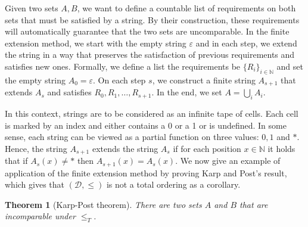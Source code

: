 \documentclass[12pt,a4paper]{article}
\newtheorem{theorem}{Theorem}
\theoremstyle{definition}
\newcommand{\N}{\mathbb{N}}                     %
\begin{document}
    Given two sets $A,B$, we want to define a countable list of requirements on both sets that must be satisfied by a string. By their construction, these requirements will automatically guarantee that the two sets are uncomparable. In the finite extension method, we start with the empty string $\varepsilon$ and in each step, we extend the string in a way that preserves the satisfaction of previous requirements and satisfies new ones. Formally, we define a list the requirements be $\{R_i\}_{i \in \N}$ and set the empty string $A_0 = \varepsilon$. On each step $s$, we construct a finite string $A_{s+1}$ that extends $A_s$ and satisfies $R_0, R_1, \ldots, R_{s+1}$. In the end, we set $A = \bigcup_{i} A_i$.
    
    In this context, strings are to be considered as an infinite tape of cells. Each cell is marked by an index and either contains a 0 or a 1 or is undefined. In some sense, each string can be viewed as a partial function on three values: $0, 1$ and $*$. Hence, the string $A_{s+1}$ extends the string $A_s$ if for each position $x \in \N$ it holds that if $A_s(x) \neq *$ then $A_{s+1}(x) = A_{s}(x)$. We now give an example of application of the finite extension method by proving Karp and Post's result, which gives that $(\mathcal{D}, \leq)$ is not a total ordering as a corollary.

    \begin{theorem}[Karp-Post theorem]
        There are two sets $A$ and $B$ that are incomparable under $\leq_T$.
    \end{theorem}
\end{document}
